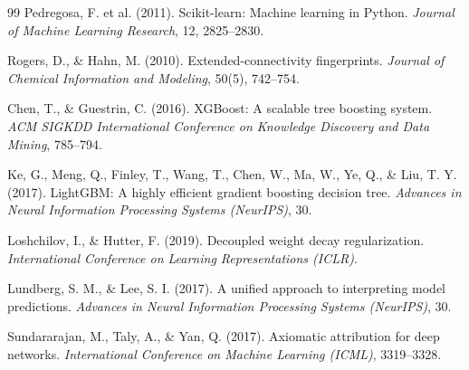 \documentclass[11pt]{article}
\begin{document}
\begin{thebibliography}{99}
 Pedregosa, F. et al. (2011). Scikit-learn: Machine learning in Python. \textit{Journal of Machine Learning Research}, 12, 2825--2830.

 Rogers, D., \& Hahn, M. (2010). Extended-connectivity fingerprints. \textit{Journal of Chemical Information and Modeling}, 50(5), 742--754.

 Chen, T., \& Guestrin, C. (2016). XGBoost: A scalable tree boosting system. \textit{ACM SIGKDD International Conference on Knowledge Discovery and Data Mining}, 785--794.

 Ke, G., Meng, Q., Finley, T., Wang, T., Chen, W., Ma, W., Ye, Q., \& Liu, T. Y. (2017). LightGBM: A highly efficient gradient boosting decision tree. \textit{Advances in Neural Information Processing Systems (NeurIPS)}, 30.

 Loshchilov, I., \& Hutter, F. (2019). Decoupled weight decay regularization. \textit{International Conference on Learning Representations (ICLR)}.

 Lundberg, S. M., \& Lee, S. I. (2017). A unified approach to interpreting model predictions. \textit{Advances in Neural Information Processing Systems (NeurIPS)}, 30.

 Sundararajan, M., Taly, A., \& Yan, Q. (2017). Axiomatic attribution for deep networks. \textit{International Conference on Machine Learning (ICML)}, 3319--3328.

\end{thebibliography}
\end{document}
